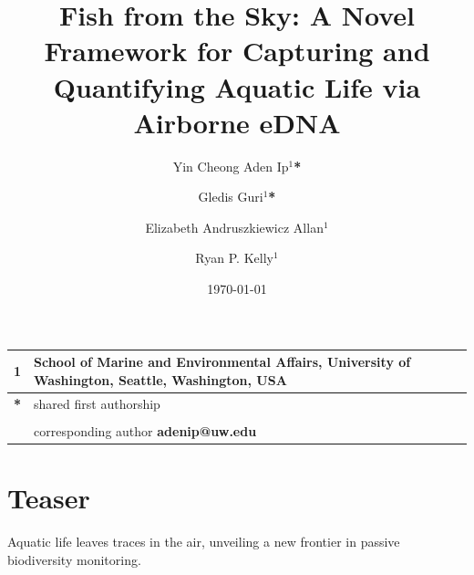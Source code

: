 \documentclass{article}
\title{Fish from the Sky: A Novel Framework for Capturing and Quantifying Aquatic Life via Airborne eDNA}
\author{Yin Cheong Aden Ip$^1$\textbf{*} \and
Gledis Guri$^1$\textbf{*} \and
Elizabeth Andruszkiewicz Allan$^1$ \and
Ryan P. Kelly$^1$}
\date{\today}
\begin{document}
\maketitle

\section*{}

\begin{center}
\begin{tabular}{ll}
1 & School of Marine and Environmental Affairs, University of Washington, Seattle, Washington, USA \\
\hline
\textbf{*} & shared first authorship\\
&\\
& corresponding author \textbf{adenip@uw.edu}
\end{tabular}
\end{center}

\section*{Teaser}
Aquatic life leaves traces in the air, unveiling a new frontier in passive biodiversity monitoring.
\end{document}

